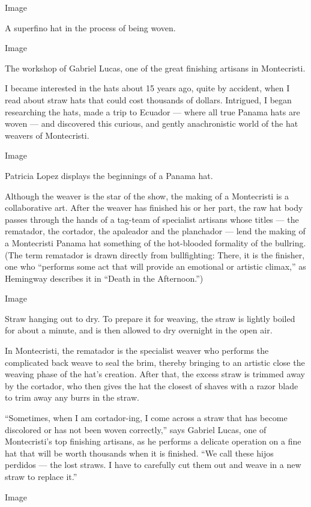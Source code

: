 Image

A superfino hat in the process of being woven.

Image

The workshop of Gabriel Lucas, one of the great finishing artisans in
Montecristi.

I became interested in the hats about 15 years ago, quite by accident,
when I read about straw hats that could cost thousands of dollars.
Intrigued, I began researching the hats, made a trip to Ecuador ---
where all true Panama hats are woven --- and discovered this curious,
and gently anachronistic world of the hat weavers of Montecristi.

Image

Patricia Lopez displays the beginnings of a Panama hat.

Although the weaver is the star of the show, the making of a Montecristi
is a collaborative art. After the weaver has finished his or her part,
the raw hat body passes through the hands of a tag-team of specialist
artisans whose titles --- the rematador, the cortador, the apaleador and
the planchador --- lend the making of a Montecristi Panama hat something
of the hot-blooded formality of the bullring. (The term rematador is
drawn directly from bullfighting: There, it is the finisher, one who
``performs some act that will provide an emotional or artistic climax,''
as Hemingway describes it in ``Death in the Afternoon.'')

Image

Straw hanging out to dry. To prepare it for weaving, the straw is
lightly boiled for about a minute, and is then allowed to dry overnight
in the open air.

In Montecristi, the rematador is the specialist weaver who performs the
complicated back weave to seal the brim, thereby bringing to an artistic
close the weaving phase of the hat's creation. After that, the excess
straw is trimmed away by the cortador, who then gives the hat the
closest of shaves with a razor blade to trim away any burrs in the
straw.

``Sometimes, when I am cortador-ing, I come across a straw that has
become discolored or has not been woven correctly,'' says Gabriel Lucas,
one of Montecristi's top finishing artisans, as he performs a delicate
operation on a fine hat that will be worth thousands when it is
finished. ``We call these hijos perdidos --- the lost straws. I have to
carefully cut them out and weave in a new straw to replace it.''

Image

